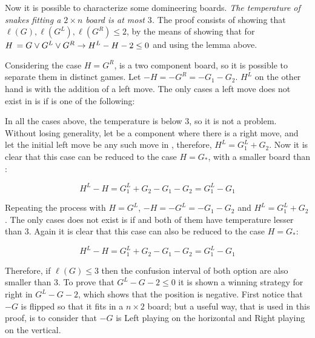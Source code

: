 Now it is possible to characterize some domineering boards. \textit{The temperature of snakes fitting a $2\times n$ board is at most $3$.} The proof consists of showing that $\ell(G), \ell(G^L), \ell(G^R) \leq 2$, by the means of showing that for $\mbox{$H\,$} = G \lor G^L \lor G^R \rightarrow H^L -H -2 \leq 0$ and using the lemma above.

Considering the case $H = G^R$, \Hm is a two component board, so it is possible to separate them in distinct games. Let $-H = -G^R = -G_1 - G_2$. $H^L$ on the other hand is  with the addition of a left move. The only cases a left move does not exist in  is if \Gm{} is one of the following:



In all the cases above, the temperature is below 3, so it is not a problem. Without losing generality, let  be a component where there is a right move, and let the initial left move be any such move in , therefore, $H^L = G_1^L + G_2$. Now it is clear that this case can be reduced to the case $H = G_*$, with \Gm{_*} a smaller board than \Gm{}:

$$
H^L - H = G_1^L + G_2 - G_1 - G_2 = G_1^L - G_1
$$

Repeating the process with $H = G^L$, $-H = -G^L = -G_1 - G_2$ and $H^L = G_1^L + G_2$. The only cases  does not exist is if
 and both of them have temperature lesser than 3. Again it is clear that this case can also be reduced to the case $H = G_*$:

$$
H^L - H = G_1^L + G_2 - G_1 - G_2 = G_1^L - G_1
$$

Therefore, if $\ell(G) \leq 3$ then the confusion interval of both option are also smaller than 3. To prove that $G^L - G - 2 \leq 0$ it is shown a winning strategy for right in $G^L - G - 2$, which shows that the position is negative. First notice that $-G$ is \Gm{} flipped so that it fits in a $n\times 2$ board; but a useful way, that is used in this proof, is to consider that $-G$ is Left playing on the horizontal and Right playing on the vertical.

